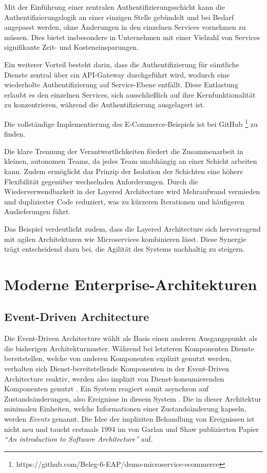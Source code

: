 \documentclass[acmtog]{acmart}
\begin{document}
Mit der Einführung einer zentralen Authentifizierungsschicht kann die Authentifizierungslogik
an einer einzigen Stelle gebündelt und bei Bedarf angepasst werden, ohne Änderungen in den
einzelnen Services vornehmen zu müssen.
Dies bietet insbesondere in Unternehmen mit einer Vielzahl von Services signifikante Zeit- und Kosteneinsparungen.

Ein weiterer Vorteil besteht darin, dass die Authentifizierung für sämtliche Dienste
zentral über ein API-Gateway durchgeführt wird, wodurch eine wiederholte Authentifizierung
auf Service-Ebene entfällt.
Diese Entlastung erlaubt es den einzelnen Services, sich ausschließlich auf ihre
Kernfunktionalität zu konzentrieren, während die Authentifizierung ausgelagert ist.

Die vollständige Implementierung des E-Commerce-Beispiels ist bei GitHub \footnote{https://github.com/Beleg-6-EAP/demo-microservice-ecommerce} zu finden.

Die klare Trennung der Verantwortlichkeiten fördert die Zusammenarbeit in kleinen, autonomen
Teams, da jedes Team unabhängig an einer Schicht arbeiten kann.
Zudem ermöglicht das Prinzip der Isolation der Schichten eine höhere Flexibilität gegenüber wechselnden Anforderungen.
Durch die Wiederverwendbarkeit in der Layered Architecture wird Mehraufwand vermieden und duplizierter
Code reduziert, was zu kürzeren Iterationen und häufigeren Auslieferungen führt.

Das Beispiel verdeutlicht zudem, dass die Layered Architecture sich hervorragend mit agilen
Architekturen wie Microservices kombinieren lässt.
Diese Synergie trägt entscheidend dazu bei, die Agilität des Systems nachhaltig zu steigern.
\section{Moderne Enterprise-Architekturen}

\subsection{Event-Driven Architecture}
Die Event-Driven Architecture wählt als Basis einen anderen Ausgangspunkt als die bisherigen Architekturmuster.
Während bei letzteren Komponenten Dienste bereitstellen, welche von anderen Komponenten explizit genutzt werden,
verhalten sich Dienst-bereitstellende Komponenten in der Event-Driven Architecture reaktiv,
werden also implizit von Dienst-konsumierenden Komponenten genutzt \cite{garlanShawImplizit}.
Ein System reagiert somit asynchron auf Zustandsänderungen, also Ereignisse in diesem System \cite{eda}.
Die in dieser Architektur minimalen Einheiten, welche Informationen einer Zustandsänderung kapseln, werden \textit{Events} genannt.
Die Idee der impliziten Behandlung von Ereignissen ist nicht neu und taucht erstmals 1994 im von Garlan und Shaw publizierten Papier
\textit{\enquote{An introduction to Software Architecture}} auf.
\end{document}
